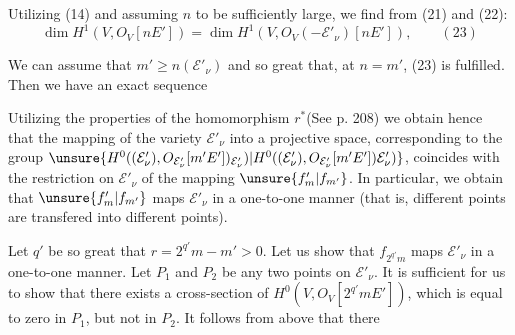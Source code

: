 Utilizing (14) and assuming $n$ to be sufficiently large, we find from (21) and (22):
\[
\dim H^1(V,O_V[nE'])=\dim H^1(V,O_V(-\mathcal E'_\nu)[nE']),\qquad (23)
\]

We can assume that $m'\ge n(\mathcal E'_\nu)$ and so great that, at $n=m'$, (23) is fulfilled. Then we have an exact sequence

Utilizing the properties of the homomorphism $r^*$(See p. 208) we obtain hence that the mapping of the variety $\mathcal E'_\nu$ into a projective space, corresponding to the group $\unsure{H^0((\mathcal E'_\nu),O_{\mathcal E'_\nu}[m'E'])_{\mathcal E'_\nu})|H^0((\mathcal E'_\nu),O_{\mathcal E'_\nu}[m'E'])\mathcal E'_\nu)}$, coincides with the restriction on $\mathcal E'_\nu$ of the mapping $\unsure{f_m'|f_{m'}}$. In particular, we obtain that $\unsure{f_m'|f_{m'}}$ maps $\mathcal E'_\nu$ in a one-to-one manner (that is, different points are transfered into different points).

Let $q'$ be so great that $r=2^{q'}m-m'>0$. Let us show that $f_{2^{q'}m}$ maps $\mathcal E'_\nu$ in a one-to-one manner. Let $P_1$ and $P_2$ be any two points on $\mathcal E'_\nu$. It is sufficient for us to show that there exists a cross-section of $H^0(V,O_V[2^{q'}mE'])$, which is equal to zero in $P_1$, but not in $P_2$. It follows from above that there
